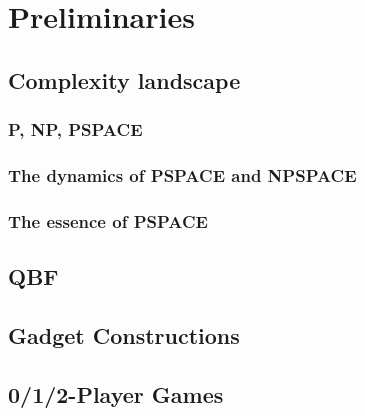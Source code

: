 \chapter{Preliminaries}

	\section{Complexity landscape}
	
		\subsection{P, NP, PSPACE}
		
		\subsection{The dynamics of PSPACE and NPSPACE}
		
		\subsection{The essence of PSPACE}
	
	\section{\ac{QBF}}
	
	\section{Gadget Constructions}
	
	\section{0/1/2-Player Games}